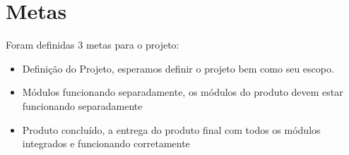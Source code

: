 \chapter*[Metas]{Metas}

Foram definidas 3 metas para o projeto:

\begin{itemize}
\item Definição do Projeto, esperamos definir o projeto bem como seu escopo.
\item Módulos funcionando separadamente, os módulos do produto devem estar funcionando separadamente
\item Produto concluído, a entrega do produto final com todos os módulos integrados e funcionando corretamente
\end{itemize}
